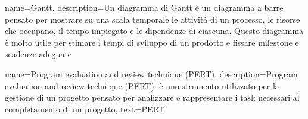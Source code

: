 {
    name={Gantt},
    description={Un diagramma di Gantt è un diagramma a barre pensato per mostrare su una scala temporale le attività di un processo, le risorse che occupano, il tempo impiegato e le dipendenze di ciascuna. Questo diagramma è molto utile per stimare i tempi di sviluppo di un prodotto e fissare milestone e scadenze adeguate}
}

{
    name={Program evaluation and review technique (PERT)},
    description={Program evaluation and review technique (PERT). è uno strumento utilizzato per la gestione di un progetto pensato per analizzare e rappresentare i task necessari al completamento di un progetto},
    text={PERT}
}